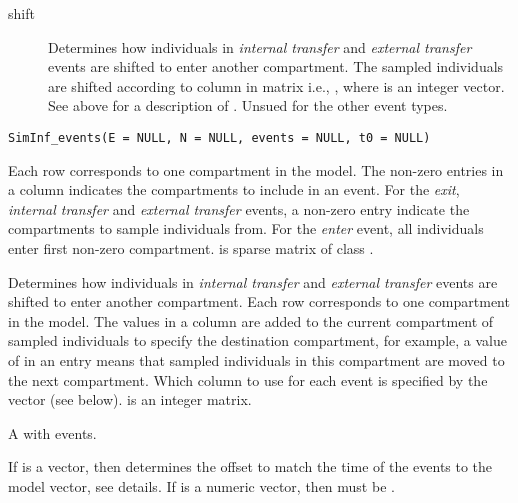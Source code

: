 \documentclass[letterpaper]{book}
\begin{document}
\begin{Description}
\begin{description}
\item[shift] 
Determines how individuals in \emph{internal transfer} and
\emph{external transfer} events are shifted to enter another
compartment.  The sampled individuals are shifted according to
column  in matrix  i.e., , where  is an integer vector.  See
above for a description of . Unsued for the other
event types.


\end{description}

\end{Description}
%
\begin{Usage}
\begin{verbatim}
SimInf_events(E = NULL, N = NULL, events = NULL, t0 = NULL)
\end{verbatim}
\end{Usage}
%
\begin{Arguments}
\begin{ldescription}
\item[\code{E}] Each row corresponds to one compartment in the model. The
non-zero entries in a column indicates the compartments to
include in an event.  For the \emph{exit}, \emph{internal
transfer} and \emph{external transfer} events, a non-zero
entry indicate the compartments to sample individuals from.
For the \emph{enter} event, all individuals enter first
non-zero compartment.  is sparse matrix of class
.

\item[\code{N}] Determines how individuals in \emph{internal transfer}
and \emph{external transfer} events are shifted to enter
another compartment.  Each row corresponds to one compartment
in the model.  The values in a column are added to the current
compartment of sampled individuals to specify the destination
compartment, for example, a value of  in an entry
means that sampled individuals in this compartment are moved
to the next compartment.  Which column to use for each event
is specified by the  vector (see below).  
is an integer matrix.

\item[\code{events}] A  with events.

\item[\code{t0}] If  is a  vector, then
 determines the offset to match the time of the
events to the model  vector, see details. If
 is a numeric vector, then  must be
.
\end{ldescription}
\end{Arguments}
\end{document}
